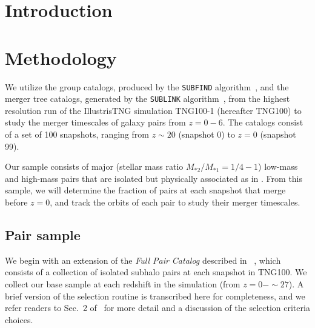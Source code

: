 \documentclass[twocolumn,linenumbers]{aastex631}
\newcommand{\paircat}{\textit{Full Pair Catalog}}
\begin{document}
\section{Introduction} \label{sec:intro}




\section{Methodology} \label{sec:methods}
We utilize the group catalogs, produced by the \texttt{SUBFIND} algorithm~\citep{Springel2001,Dolag2009}, and the merger tree catalogs, generated by the \texttt{SUBLINK} algorithm~\citep{RG2015}, from the highest resolution run of the IllustrisTNG simulation TNG100-1 (hereafter TNG100) to study the merger timescales of galaxy pairs from $z=0-6$.
The catalogs consist of a set of 100 snapshots, ranging from $z\sim20$ (snapshot 0) to $z=0$ (snapshot 99).

Our sample consists of major (stellar mass ratio $M_{*2}/M_{*1}= 1/4 - 1$) low-mass and high-mass pairs that are isolated but physically associated as in \citet{Chamberlain2024}.
From this sample, we will determine the fraction of pairs at each snapshot that merge before $z=0$, and track the orbits of each pair to study their merger timescales.

\subsection{Pair sample}
We begin with an extension of the \paircat{} described in ~\citet{Chamberlain2024}, which consists of a collection of isolated subhalo pairs at each snapshot in TNG100. 
We collect our base sample at each redshift in the simulation (from $z=0-\sim 27$). 
A brief version of the selection routine is transcribed here for completeness, and we refer readers to Sec.~2 of~\citet{Chamberlain2024} for more detail and a discussion of the selection criteria choices. 
\end{document}
